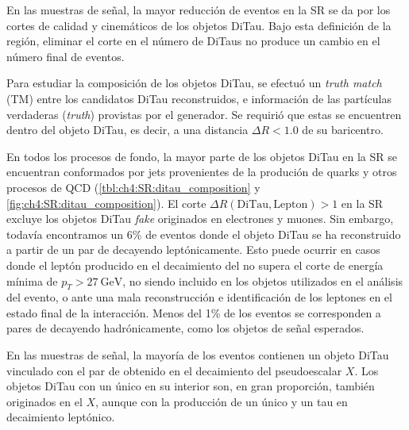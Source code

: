 En las muestras de señal, la mayor reducción de eventos en la SR se da por los cortes de calidad y cinemáticos de los objetos DiTau. Bajo esta definición de la región, eliminar el corte en el número de DiTaus no produce un cambio en el número final de eventos.

Para estudiar la composición de los objetos DiTau, se efectuó un \textit{truth match} (TM) entre los candidatos DiTau reconstruidos, e información de las partículas verdaderas (\textit{truth}) provistas por el generador. Se requirió que estas se encuentren dentro del objeto DiTau, es decir, a una distancia $\Delta R < 1.0$ de su baricentro.

En todos los procesos de fondo, la mayor parte de los objetos DiTau en la SR se encuentran conformados por jets provenientes de la produción de quarks y otros procesos de QCD (\cref{tbl:ch4:SR:ditau_composition} y \cref{fig:ch4:SR:ditau_composition}). El corte $\Delta R(\text{DiTau}, \text{Lepton}) > 1$ en la SR excluye los objetos DiTau \textit{fake} originados en electrones y muones. Sin embargo, todavía encontramos un $6\%$ de eventos donde el objeto DiTau se ha reconstruido a partir de un par de \ttaus decayendo leptónicamente. Esto puede ocurrir en casos donde el leptón producido en el decaimiento del \ttau no supera el corte de energía mínima de $p_T > \SI{27}{\GeV}$, no siendo incluido en los objetos utilizados en el análisis del evento, o ante una mala reconstrucción e identificación de los leptones en el estado final de la interacción. Menos del 1\% de los eventos se corresponden a pares de \ttaus decayendo hadrónicamente, como los objetos de señal esperados.

En las muestras de señal, la mayoría de los eventos contienen un objeto DiTau vinculado con el par de \thads obtenido en el decaimiento del pseudoescalar $X$. Los objetos DiTau con un único \thad en su interior son, en gran proporción, también originados en el $X$, aunque con la producción de un único \thad y un tau en decaimiento leptónico.

